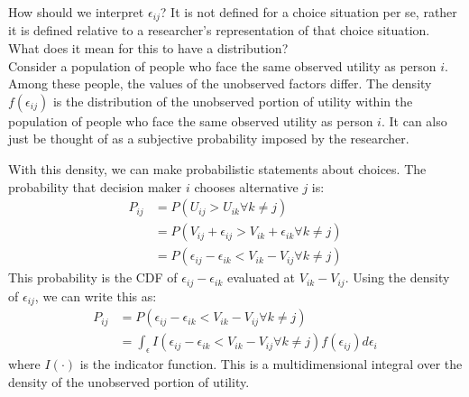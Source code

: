 \documentclass[DIV=14,titlepage=false]{scrreprt}
\begin{document}
\begin{note}
    How should we interpret $\epsilon_{ij}$? It is not defined for a choice situation per se, rather it is defined relative to a researcher's representation of that choice situation. What does it mean for this to have a distribution?\\
    Consider a population of people who face the same observed utility as person $i$. Among these people, the values of the unobserved factors differ. The density $f(\epsilon_{ij})$ is the distribution of the unobserved portion of utility within the population of people who face the same observed utility as person $i$. It can also just be thought of as a subjective probability imposed by the researcher.
\end{note}
With this density, we can make probabilistic statements about choices. The probability that decision maker $i$ chooses alternative $j$ is:
\begin{align*}
    P_{ij} &= P(U_{ij} > U_{ik} \forall k \neq j) \\
    &= P(V_{ij} + \epsilon_{ij} > V_{ik} + \epsilon_{ik} \forall k \neq j) \\
    &= P(\epsilon_{ij} - \epsilon_{ik} < V_{ik} - V_{ij} \forall k \neq j) 
\end{align*}
This probability is the CDF of $\epsilon_{ij} - \epsilon_{ik}$ evaluated at $V_{ik} - V_{ij}$. Using the density of $\epsilon_{ij}$, we can write this as:
\begin{align*}
    P_{ij} &= P(\epsilon_{ij} - \epsilon_{ik} < V_{ik} - V_{ij} \forall k \neq j) \\
    &= \int_\epsilon I(\epsilon_{ij} - \epsilon_{ik} < V_{ik} - V_{ij} \forall k \neq j) f(\epsilon_{ij}) d\epsilon_{i} 
\end{align*}
where $I(\cdot)$ is the indicator function. This is a multidimensional integral over the density of the unobserved portion of utility.
\end{document}
